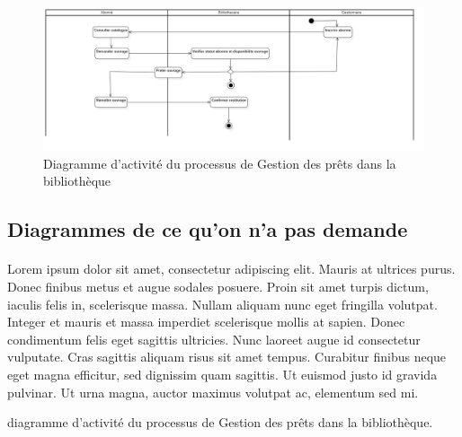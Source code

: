 \paragraph{}
\begin{figure}[h]
        \centering
        \includegraphics[width=1\textwidth]{ActivityDiagram1}
        \caption{Diagramme d’activité du processus de Gestion des prêts dans la bibliothèque}
        \label{image-ActivityDiagram1}
        \end{figure}
\par


\subsection{Diagrammes de ce qu'on n'a pas demande}
\paragraph{} 
Lorem ipsum dolor sit amet, consectetur adipiscing elit. Mauris at ultrices purus. Donec finibus metus et augue sodales posuere. Proin sit amet turpis dictum, iaculis felis in, scelerisque massa. Nullam aliquam nunc eget fringilla volutpat. Integer et mauris et massa imperdiet scelerisque mollis at sapien. Donec condimentum felis eget sagittis ultricies. Nunc laoreet augue id consectetur vulputate. Cras sagittis aliquam risus sit amet tempus. Curabitur finibus neque eget magna efficitur, sed dignissim quam sagittis. Ut euismod justo id gravida pulvinar. Ut urna magna, auctor maximus volutpat ac, elementum sed mi.

diagramme d’activité du processus de Gestion des prêts dans la bibliothèque.